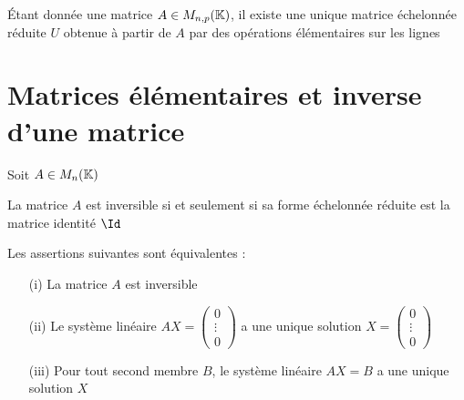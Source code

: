 \begin{frame}
\begin{theoreme}\label{Gauss} 
\'Etant donnée une matrice $A\in M_{n,p}(\mathbb{K})$, il existe une unique  
matrice échelonnée réduite $U$ obtenue à partir de $A$ 
par des opérations élémentaires sur les lignes 
\end{theoreme}



\end{frame}


\section{Matrices élémentaires et inverse d'une matrice}


\begin{frame}

Soit $A\in M_{n}(\mathbb{K})$
\begin{theoreme} 
\label{th:invequi}
La matrice $A$ est inversible si et seulement si sa forme échelonnée réduite 
est la matrice identité $\Id$
\end{theoreme}

\pause

\begin{corollaire}
Les assertions suivantes sont équivalentes :
\begin{itemize}
  \item[(i)] La matrice $A$ est inversible
  
  \item[(ii)] Le système linéaire $AX=\left(\begin{smallmatrix} 0 \\ \vdots \\ 0\end{smallmatrix}\right)$ a une unique solution 
  $X=\left(\begin{smallmatrix} 0 \\ \vdots \\ 0\end{smallmatrix}\right)$
             
  \item[(iii)] Pour tout second membre $B$, le système linéaire $AX=B$
  a une unique solution $X$
\end{itemize}
\end{corollaire}

\end{frame}


